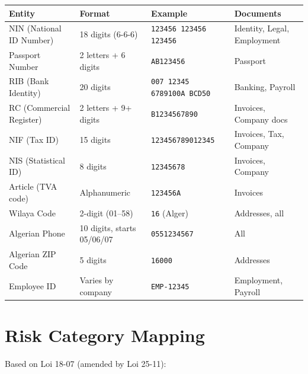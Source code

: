 \documentclass[11pt,a4paper]{article}
\begin{document}
\begin{longtable}{|p{5cm}|p{3.5cm}|p{3.5cm}|p{3.5cm}|}
\hline
\textbf{Entity} & \textbf{Format} & \textbf{Example} & \textbf{Documents} \\
\hline
\endhead

NIN (National ID Number)
&
18 digits (6-6-6)
&
\texttt{123456 123456 123456}
&
Identity, Legal, Employment
\\ \hline

Passport Number
&
2 letters + 6 digits
&
\texttt{AB123456}
&
Passport
\\ \hline

RIB (Bank Identity)
&
20 digits
&
\texttt{007 12345 6789100A BCD50}
&
Banking, Payroll
\\ \hline

RC (Commercial Register)
&
2 letters + 9+ digits
&
\texttt{B1234567890}
&
Invoices, Company docs
\\ \hline

NIF (Tax ID)
&
15 digits
&
\texttt{123456789012345}
&
Invoices, Tax, Company
\\ \hline

NIS (Statistical ID)
&
8 digits
&
\texttt{12345678}
&
Invoices, Company
\\ \hline

Article (TVA code)
&
Alphanumeric
&
\texttt{123456A}
&
Invoices
\\ \hline

Wilaya Code
&
2-digit (01--58)
&
\texttt{16} (Alger)
&
Addresses, all
\\ \hline

Algerian Phone
&
10 digits, starts 05/06/07
&
\texttt{0551234567}
&
All
\\ \hline

Algerian ZIP Code
&
5 digits
&
\texttt{16000}
&
Addresses
\\ \hline

Employee ID
&
Varies by company
&
\texttt{EMP-12345}
&
Employment, Payroll
\\ \hline

\end{longtable}

\section{Risk Category Mapping}

Based on Loi 18-07 (amended by Loi 25-11):
\end{document}
